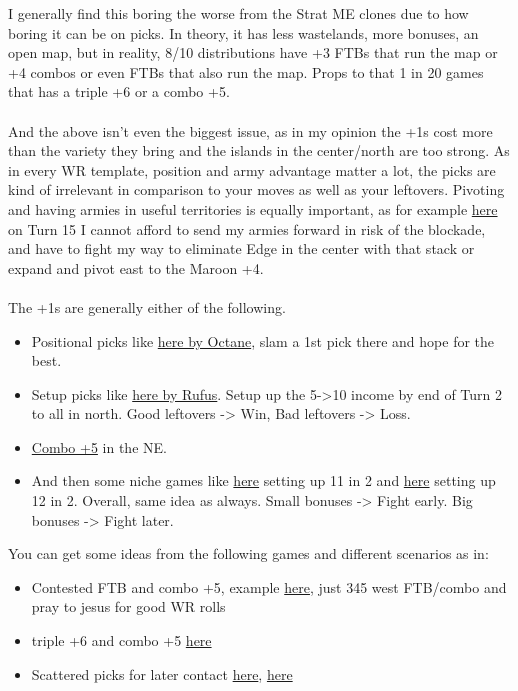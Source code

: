 I generally find this boring the worse from the Strat ME clones due to how boring it can be on picks. In theory, it has less wastelands, more bonuses, an open map, but in reality, 8/10 distributions have +3 FTBs that run the map or +4 combos or even FTBs that also run the map. Props to that 1 in 20 games that has a triple +6 or a combo +5.
\\
\\
And the above isn't even the biggest issue, as in my opinion the +1s cost more than the variety they bring and the islands in the center/north are too strong. As in every WR template, position and army advantage matter a lot, the picks are kind of irrelevant in comparison to your moves as well as your leftovers. Pivoting and having armies in useful territories is equally important, as for example \href{https://www.warzone.com/MultiPlayer?GameID=39344277}{here} on Turn 15 I cannot afford to send my armies forward in risk of the blockade, and have to fight my way to eliminate Edge in the center with that stack or expand and pivot east to the Maroon +4.
\\
\\
The +1s are generally either of the following.
\begin{itemize}
    \item Positional picks like \href{https://www.warzone.com/MultiPlayer?GameID=36558136}{here by Octane}, slam a 1st pick there and hope for the best.
    \item Setup picks like \href{https://www.warzone.com/MultiPlayer?GameID=40571550}{here by Rufus}. Setup up the 5->10 income by end of Turn 2 to all in north. Good leftovers -> Win, Bad leftovers -> Loss. 
    \item \href{https://www.warzone.com/MultiPlayer?GameID=36549357}{Combo +5} in the NE.
    \item And then some niche games like \href{https://www.warzone.com/MultiPlayer?GameID=25558453}{here} setting up 11 in 2 and \href{https://www.warzone.com/MultiPlayer?GameID=41473762}{here} setting up 12 in 2. Overall, same idea as always. Small bonuses -> Fight early. Big bonuses -> Fight later.
\end{itemize}
You can get some ideas from the following games and different scenarios as in:
\begin{itemize}
    \item Contested FTB and combo +5, example \href{https://www.warzone.com/MultiPlayer?GameID=38753471}{here}, just 345 west FTB/combo and pray to jesus for good WR rolls
    \item triple +6 and combo +5 \href{https://www.warzone.com/MultiPlayer?GameID=33947836}{here}
    \item Scattered picks for later contact \href{https://www.warzone.com/MultiPlayer?GameID=33377309}{here}, \href{https://www.warzone.com/MultiPlayer?GameID=38375555}{here}
\end{itemize}
